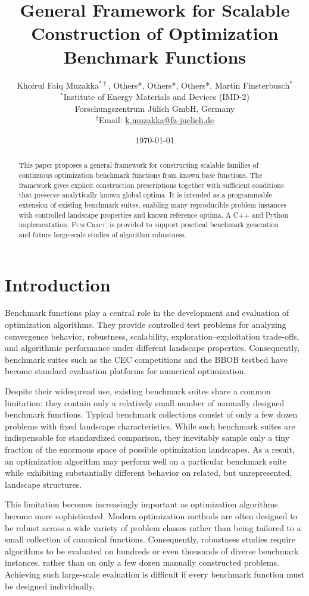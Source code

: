 \documentclass[11pt,a4paper]{article}
\title{General Framework for Scalable Construction of Optimization Benchmark Functions}
\author{
	Khoirul Faiq Muzakka\(^{\ast\dagger}\),
	Others*, 
	Others*,
	Others*,
	Martin Finsterbusch\(^{\ast}\)\\
	\small \(^{\ast}\)Institute of Energy Materials and Devices (IMD-2)\\
	\small Forschungszentrum J\"ulich GmbH, Germany\\
	\small \(^{\dagger}\)Email: \href{mailto:k.muzakka@fz-juelich.de}{k.muzakka@fz-juelich.de}
}
\date{\today}
\theoremstyle{remark}
\theoremstyle{plain}
\begin{document}
\maketitle

\begin{abstract}
This paper proposes a general framework for constructing scalable families of
continuous optimization benchmark functions from known base functions. The
framework gives explicit construction prescriptions together with sufficient
conditions that preserve analytically known global optima. It is intended as a
programmable extension of existing benchmark suites, enabling many reproducible
problem instances with controlled landscape properties and known reference
optima. A C++ and Python implementation, \textsc{FuncCraft}, is provided to support
practical benchmark generation and future large-scale studies of algorithm
robustness.
\end{abstract}

\setcounter{tocdepth}{1}
\tableofcontents


\section{Introduction}
\label{sec:introduction}

Benchmark functions play a central role in the development and evaluation of
optimization algorithms. They provide controlled test problems for analyzing
convergence behavior, robustness, scalability, exploration--exploitation
trade-offs, and algorithmic performance under different landscape properties.
Consequently, benchmark suites such as the CEC competitions and the BBOB
testbed have become standard evaluation platforms for numerical optimization.

Despite their widespread use, existing benchmark suites share a common
limitation: they contain only a relatively small number of manually designed
benchmark functions. Typical benchmark collections consist of only a few dozen
problems with fixed landscape characteristics. While such benchmark suites are
indispensable for standardized comparison, they inevitably sample only a tiny
fraction of the enormous space of possible optimization landscapes. As a
result, an optimization algorithm may perform well on a particular benchmark
suite while exhibiting substantially different behavior on related, but
unrepresented, landscape structures.

This limitation becomes increasingly important as optimization algorithms become
more sophisticated. Modern optimization methods are often designed to be robust
across a wide variety of problem classes rather than being tailored to a small
collection of canonical functions. Consequently, robustness studies require
algorithms to be evaluated on hundreds or even thousands of diverse benchmark
instances, rather than on only a few dozen manually constructed problems.
Achieving such large-scale evaluation is difficult if every benchmark function
must be designed individually.
\end{document}
